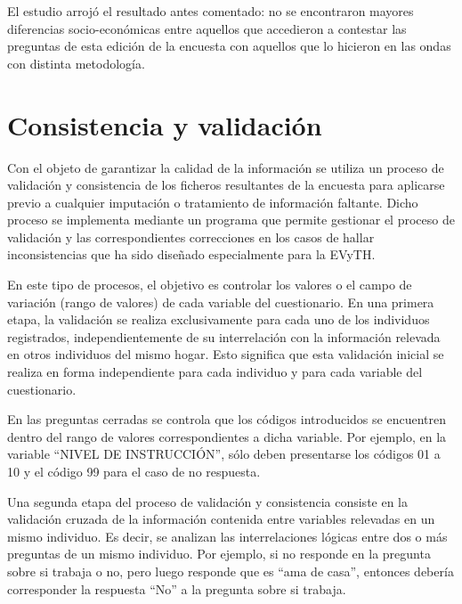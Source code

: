 \documentclass[
  openany]{book}
\begin{document}
El estudio arrojó el resultado antes comentado: no se encontraron mayores diferencias socio-económicas entre aquellos que accedieron a contestar las preguntas de esta edición de la encuesta con aquellos que lo hicieron en las ondas con distinta metodología.

\hypertarget{consistencia-y-validaciuxf3n}{%
\section{Consistencia y validación}\label{consistencia-y-validaciuxf3n}}

Con el objeto de garantizar la calidad de la información se utiliza un proceso de validación y consistencia de los ficheros resultantes de la encuesta para aplicarse previo a cualquier imputación o tratamiento de información faltante. Dicho proceso se implementa mediante un programa que permite gestionar el proceso de validación y las correspondientes correcciones en los casos de hallar inconsistencias que ha sido diseñado especialmente para la EVyTH.

En este tipo de procesos, el objetivo es controlar los valores o el campo de variación (rango de valores) de cada variable del cuestionario. En una primera etapa, la validación se realiza exclusivamente para cada uno de los individuos registrados, independientemente de su interrelación con la información relevada en otros individuos del mismo hogar. Esto significa que esta validación inicial se realiza en forma independiente para cada individuo y para cada variable del cuestionario.

En las preguntas cerradas se controla que los códigos introducidos se encuentren dentro del rango de valores correspondientes a dicha variable. Por ejemplo, en la variable ``NIVEL DE INSTRUCCIÓN'', sólo deben presentarse los códigos 01 a 10 y el código 99 para el caso de no respuesta.

Una segunda etapa del proceso de validación y consistencia consiste en la validación cruzada de la información contenida entre variables relevadas en un mismo individuo. Es decir, se analizan las interrelaciones lógicas entre dos o más preguntas de un mismo individuo. Por ejemplo, si no responde en la pregunta sobre si trabaja o no, pero luego responde que es ``ama de casa'', entonces debería corresponder la respuesta ``No'' a la pregunta sobre si trabaja.
\end{document}
